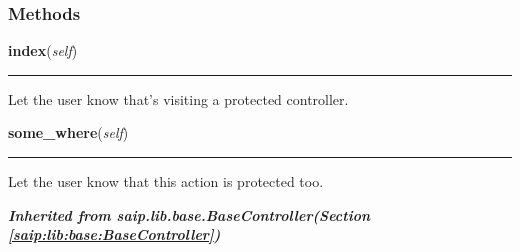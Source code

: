   \subsubsection{Methods}

    \label{saip:controllers:secure:SecureController:index}

    \vspace{0.5ex}

\hspace{.8\funcindent}\begin{boxedminipage}{\funcwidth}

    \raggedright \textbf{index}(\textit{self})

    \vspace{-1.5ex}

    \rule{\textwidth}{0.5\fboxrule}
\setlength{\parskip}{2ex}
    Let the user know that's visiting a protected controller.

\setlength{\parskip}{1ex}
    \end{boxedminipage}

    \label{saip:controllers:secure:SecureController:some_where}

    \vspace{0.5ex}

\hspace{.8\funcindent}\begin{boxedminipage}{\funcwidth}

    \raggedright \textbf{some\_where}(\textit{self})

    \vspace{-1.5ex}

    \rule{\textwidth}{0.5\fboxrule}
\setlength{\parskip}{2ex}
    Let the user know that this action is protected too.

\setlength{\parskip}{1ex}
    \end{boxedminipage}


\large{\textbf{\textit{Inherited from saip.lib.base.BaseController\textit{(Section \ref{saip:lib:base:BaseController})}}}}

